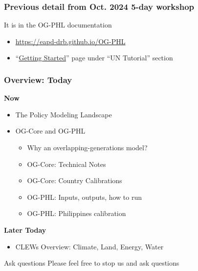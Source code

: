 \documentclass{beamer}
\begin{document}
  \begin{frame}
    \frametitle{Previous detail from Oct. 2024 5-day workshop}
    \begin{alertblock}{It is in the OG-PHL documentation}
      \begin{itemize}
        \vspace{3mm}
        \item \href{https://eapd-drb.github.io/OG-PHL}{https://eapd-drb.github.io/OG-PHL}
        \vspace{8mm}
        \item ``\href{https://eapd-drb.github.io/OG-PHL/content/UNtutorial/getting_started.html}{Getting Started}'' page under ``UN Tutorial'' section
        \vspace{3mm}
      \end{itemize}
    \end{alertblock}
  \end{frame}

  \begin{frame}
    \frametitle{Overview: Today}
    \textbf{Now}
    \begin{itemize}
      \item The Policy Modeling Landscape
      \item OG-Core and OG-PHL
      \begin{itemize}
        \item Why an overlapping-generations model?
        \item OG-Core: Technical Notes
        \item OG-Core: Country Calibrations
        \item OG-PHL: Inputs, outputs, how to run
        \item OG-PHL: Philippines calibration
      \end{itemize}
    \end{itemize}
    \vspace{5mm}
    \textbf{Later Today}
    \begin{itemize}
      \item CLEWs Overview: Climate, Land, Energy, Water
    \end{itemize}
    \begin{alertblock}{Ask questions}
      Please feel free to stop us and ask questions
    \end{alertblock}
  \end{frame}
\end{document}
